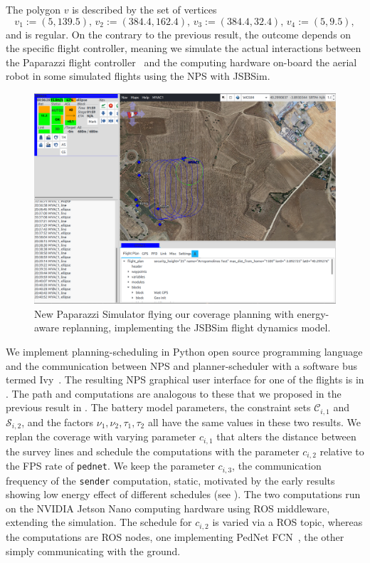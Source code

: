The polygon $v$ is described by the set of vertices
\begin{equation}
  v_1:=(5,139.5),\,v_2:=(384.4,162.4),\,v_3:=(384.4,32.4),\,v_4:=(5,9.5),
\end{equation}
and is regular. 
On the contrary to the previous result, the outcome depends on the specific flight controller, meaning we simulate the actual interactions between the Paparazzi flight controller~\citep{papa} and the computing hardware on-board the aerial robot in some simulated flights using the NPS with JSBSim. 
\begin{figure}[h!]
  \centering
  \includegraphics[width=.7\textwidth]{pictures/paparazzi}
  \caption[New Paparazzi Simulator flying our coverage planning with energy-aware replanning]{New Paparazzi Simulator flying our coverage planning with energy-aware replanning, implementing the JSBSim flight dynamics model.}   
  \label{fig:pprz-screen}
\end{figure}
We implement planning-scheduling in Python open source programming language and the communication between NPS and planner-scheduler with a software bus termed Ivy~\citep{ivybus}. The resulting NPS graphical user interface for one of the flights is in . The path and computations are analogous to these that we proposed in the previous result in . The battery model parameters, the constraint sets $\mathcal{C}_{i,1}$ and $\mathcal{S}_{i,2}$, and the factors $\nu_1,\nu_2,\tau_1,\tau_2$ all have the same values in these two results. We replan the coverage with varying parameter $c_{i,1}$ that alters the distance between the survey lines and schedule the computations with the parameter $c_{i,2}$ relative to the FPS rate of {\small\tt pednet}. We keep the parameter $c_{i,3}$, the communication frequency of the {\small\tt sender} computation, static, motivated by the early results showing low energy effect of different schedules (see ). The two computations run on the NVIDIA Jetson Nano computing hardware using ROS middleware, extending the simulation. The schedule for $c_{i,2}$ is varied via a ROS topic, whereas the computations are ROS nodes, one implementing PedNet FCN~\citep{ullah2018pednet}, the other simply communicating with the ground.

